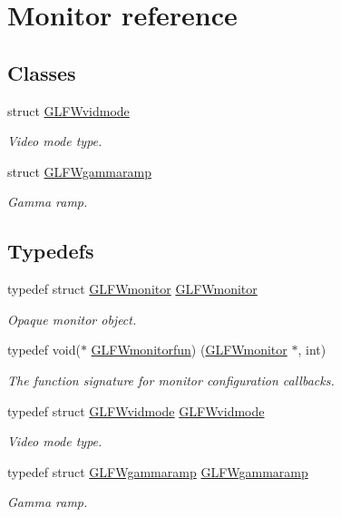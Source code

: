 \hypertarget{group__monitor}{}\section{Monitor reference}
\label{group__monitor}
\subsection*{Classes}
\begin{DoxyCompactItemize}
\item 
struct \hyperlink{struct_g_l_f_wvidmode}{G\+L\+F\+Wvidmode}
\begin{DoxyCompactList}\small\item\em Video mode type. \end{DoxyCompactList}\item 
struct \hyperlink{struct_g_l_f_wgammaramp}{G\+L\+F\+Wgammaramp}
\begin{DoxyCompactList}\small\item\em Gamma ramp. \end{DoxyCompactList}\end{DoxyCompactItemize}
\subsection*{Typedefs}
\begin{DoxyCompactItemize}
\item 
typedef struct \hyperlink{group__monitor_ga8d9efd1cde9426692c73fe40437d0ae3}{G\+L\+F\+Wmonitor} \hyperlink{group__monitor_ga8d9efd1cde9426692c73fe40437d0ae3}{G\+L\+F\+Wmonitor}
\begin{DoxyCompactList}\small\item\em Opaque monitor object. \end{DoxyCompactList}\item 
typedef void($\ast$ \hyperlink{group__monitor_ga8a7ee579a66720f24d656526f3e44c63}{G\+L\+F\+Wmonitorfun}) (\hyperlink{group__monitor_ga8d9efd1cde9426692c73fe40437d0ae3}{G\+L\+F\+Wmonitor} $\ast$, int)
\begin{DoxyCompactList}\small\item\em The function signature for monitor configuration callbacks. \end{DoxyCompactList}\item 
typedef struct \hyperlink{struct_g_l_f_wvidmode}{G\+L\+F\+Wvidmode} \hyperlink{group__monitor_gae48aadf4ea0967e6605c8f58fa5daccb}{G\+L\+F\+Wvidmode}
\begin{DoxyCompactList}\small\item\em Video mode type. \end{DoxyCompactList}\item 
typedef struct \hyperlink{struct_g_l_f_wgammaramp}{G\+L\+F\+Wgammaramp} \hyperlink{group__monitor_gaec0bd37af673be8813592849f13e02f0}{G\+L\+F\+Wgammaramp}
\begin{DoxyCompactList}\small\item\em Gamma ramp. \end{DoxyCompactList}\end{DoxyCompactItemize}
